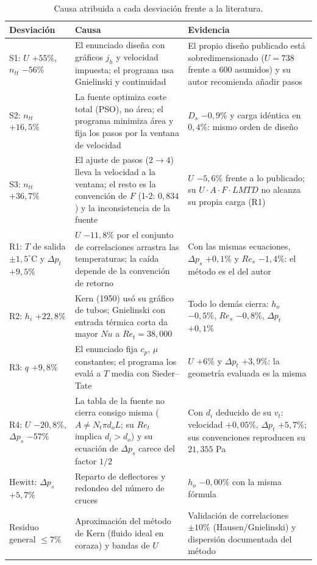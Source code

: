 \documentclass[11pt,a4paper]{article}
\begin{document}
\begin{table}[htbp]
\centering
\caption{Causa atribuida a cada desviaci\'on frente a la literatura.}
\label{tab:causas}
\footnotesize
\setlength{\tabcolsep}{4pt}
\begin{tabular}{@{}p{3.1cm}p{4.6cm}p{5.2cm}@{}}
\toprule
\textbf{Desviaci\'on} & \textbf{Causa} & \textbf{Evidencia} \\
\midrule
S1: $U$ $+55\%$, $n_{tt}$ $-56\%$ & El enunciado dise\~na con gr\'aficos
$j_h$ y velocidad impuesta; el programa usa Gnielinski y continuidad &
El propio dise\~no publicado est\'a sobredimensionado ($U = 738$ frente a
$600$ asumidos) y su autor recomienda a\~nadir pasos \\
S2: $n_{tt}$ $+16{,}5\%$ & La fuente optimiza coste total (PSO), no
\'area; el programa minimiza \'area y fija los pasos por la ventana de
velocidad & $D_s$ $-0{,}9\%$ y carga
id\'entica en $0{,}4\%$: mismo orden de dise\~no \\
S3: $n_{tt}$ $+36{,}7\%$ & El ajuste de pasos ($2\rightarrow 4$) lleva la velocidad a la ventana; el resto es la convenci\'on de $F$ (1-2: $0{,}834$) y la inconsistencia de la fuente & $U$ $-5{,}6\%$ frente a lo publicado; su $U\cdot A\cdot F\cdot LMTD$ no alcanza su propia carga (R1) \\
R1: $T$ de salida $\pm 1{,}5^\circ$C y $\Delta p_t$ $+9{,}5\%$
& $U$ $-11{,}8\%$ por el conjunto de correlaciones arrastra las
temperaturas; la ca\'ida depende de la convenci\'on de retorno
& Con las mismas ecuaciones, $\Delta p_s$ $+0{,}1\%$ y $Re_s$
$-1{,}4\%$: el m\'etodo es el del autor \\
R2: $h_i$ $+22{,}8\%$ & Kern (1950) us\'o su gr\'afico de tubos;
Gnielinski con entrada t\'ermica corta da mayor $Nu$ a $Re_t = 38{,}000$
& Todo lo dem\'as cierra: $h_o$ $-0{,}5\%$, $Re_s$ $-0{,}8\%$,
$\Delta p_t$ $+0{,}1\%$ \\
R3: $q$ $+9{,}8\%$ & El enunciado fija $c_p$, $\mu$ constantes; el
programa los eval\'a a $T$ media con Sieder--Tate & $U$ $+6\%$ y
$\Delta p_t$ $+3{,}9\%$: la geometr\'ia evaluada es la misma \\
R4: $U$ $-20{,}8\%$, $\Delta p_s$ $-57\%$ & La tabla de la fuente no
cierra consigo misma ($A \neq N_t \pi d_o L$; su $Re_t$ implica
$d_i > d_o$) y su ecuaci\'on de $\Delta p_s$ carece del factor $1/2$
& Con $d_i$ deducido de su $v_t$: velocidad $+0{,}05\%$,
$\Delta p_t$ $+5{,}7\%$; sus convenciones reproducen su $21{,}355$ Pa
\\
Hewitt: $\Delta p_s$ $+5{,}7\%$ & Reparto de deflectores y redondeo del
n\'umero de cruces & $h_o$ $-0{,}00\%$ con la misma f\'ormula \\
Residuo general $\leq 7\%$ & Aproximaci\'on del m\'etodo de Kern
(fluido ideal en coraza) y bandas de $U$ & Validaci\'on de correlaciones
$\pm 10\%$ (Hausen/Gnielinski) y dispersi\'on documentada del
m\'etodo \\
\bottomrule
\end{tabular}
\end{table}
\end{document}
